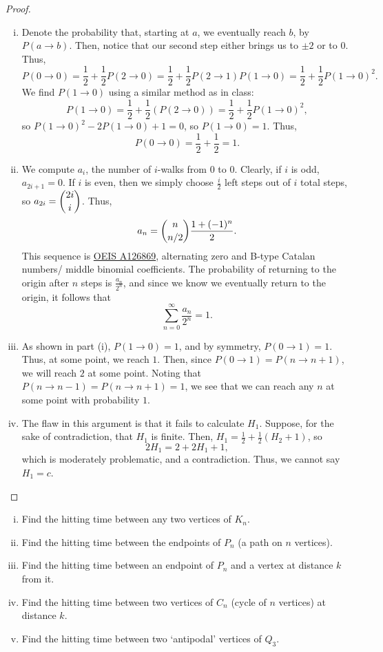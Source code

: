 \documentclass[11pt]{scrartcl}
\begin{document}
\begin{proof}
    \begin{enumerate}[(i)]
        \item Denote the probability that, starting at $a$, we eventually reach $b$, by $P(a\to b)$. Then, notice that our second step either brings us to $\pm 2$ or to $0$. Thus, \[P(0\to 0)=\frac12+\frac12P(2\to 0)=\frac12+\frac12P(2\to1)P(1\to0)=\frac12+\frac12P(1\to 0)^2.\]
        We find $P(1\to0)$ using a similar method as in class:
        \[P(1\to 0)=\frac12+\frac12(P(2\to 0))=\frac12+\frac12 P(1\to0)^2,\] so $P(1\to0)^2-2P(1\to 0)+1=0$, so $P(1\to 0)=1$. Thus, \[P(0\to 0)=\frac12+\frac12=1.\]
        \item We compute $a_i$, the number of $i$-walks from $0$ to $0$. Clearly, if $i$ is odd, $a_{2i+1}=0$. If $i$ is even, then we simply choose $\frac{i}2$ left steps out of $i$ total steps, so $a_{2i}=\dbinom{2i}{i}$. Thus, \[a_n=\dbinom{n}{n/2}\frac{1+(-1)^n}{2}.\] This sequence is \href{https://oeis.org/A126869}{OEIS A126869}, alternating zero and B-type Catalan numbers/ middle binomial coefficients. The probability of returning to the origin after $n$ steps is $\frac{a_n}{2^n}$, and since we know we eventually return to the origin, it follows that \[\sum_{n=0}^{\infty}\frac{a_n}{2^n}=1.\]
        \item As shown in part (i), $P(1\to 0)=1$, and by symmetry, $P(0\to 1)=1$. Thus, at some point, we reach $1$. Then, since $P(0\to 1)=P(n\to n+1)$, we will reach $2$ at some point. Noting that $P(n\to n-1)=P(n\to n+1)=1$, we see that we can reach any $n$ at some point with probability $1$.
        \item The flaw in this argument is that it fails to calculate $H_1$. Suppose, for the sake of contradiction, that $H_1$ is finite. Then, $H_1=\frac{1}{2}+\frac{1}{2}(H_2+1)$, so \[2H_1=2+2H_1+1,\] which is moderately problematic, and a contradiction. Thus, we cannot say $H_1=c$.
    \end{enumerate}
\end{proof}
\begin{problem}[\textcolor{red}{Some examples of Hitting times}]\phantom{0}

    \begin{enumerate}[(i)]
        \item Find the hitting time between any two vertices of $K_n$.
        \item Find the hitting time between the endpoints of $P_n$ (a path on $n$ vertices).
        \item Find the hitting time between an endpoint of $P_n$ and a vertex at distance $k$ from it.
        \item Find the hitting time between two vertices of $C_n$ (cycle of $n$ vertices) at distance $k$.
        \item Find the hitting time between two `antipodal' vertices of $Q_3$.
    \end{enumerate}
\end{problem}
\end{document}
